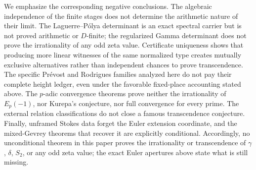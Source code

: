 We emphasize the corresponding negative conclusions.  The algebraic independence of the
finite stages does not determine the arithmetic nature of their limit.  The
Laguerre--P\'olya determinant is an exact spectral carrier but is not proved
arithmetic or \(D\)-finite; the regularized Gamma determinant does not prove
the irrationality of any odd zeta value.  Certificate uniqueness shows that producing more
linear witnesses of the same normalized type creates mutually exclusive
alternatives rather than independent chances to prove transcendence.  The
specific Pr\'evost and Rodrigues families analyzed here do not pay their
complete height ledger, even under the favorable fixed-place accounting
stated above.  The \(p\)-adic convergence theorems prove neither the
irrationality of \(E_p(-1)\), nor Kurepa's conjecture, nor full convergence
for every prime.  The external relation classifications do not close a
famous transcendence conjecture.  Finally, unframed Stokes data forget the
Euler extension coordinate, and the mixed-Gevrey theorems that recover it
are explicitly conditional.
Accordingly, no unconditional theorem in this paper proves the irrationality or
transcendence of \(\gamma\), \(\delta\), \(S_2\), or any odd zeta value; the
exact Euler apertures above state what is still missing.
